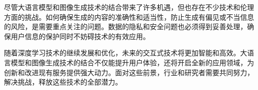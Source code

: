 \documentclass[a4paper,AutoFakeBold,oneside,12pt]{book}
\begin{document}
尽管大语言模型和图像生成技术的结合带来了许多机遇，但也存在不少技术和伦理方面的挑战。如何确保生成的内容的准确性和适当性，防止生成有偏见或不当信息的风险，是需要重点关注的问题。数据的隐私和安全问题也必须得到妥善处理，确保用户信息的保护同时不妨碍技术的有效应用。

随着深度学习技术的继续发展和优化，未来的交互式技术将更加智能和高效。大语言模型和图像生成技术的结合不仅能提升用户体验，还将开启全新的应用领域，为创新和改进现有服务提供强大动力。面对这些前景，行业和研究者需要共同努力，解决挑战，释放这些技术的全部潜力。






\end{document}
